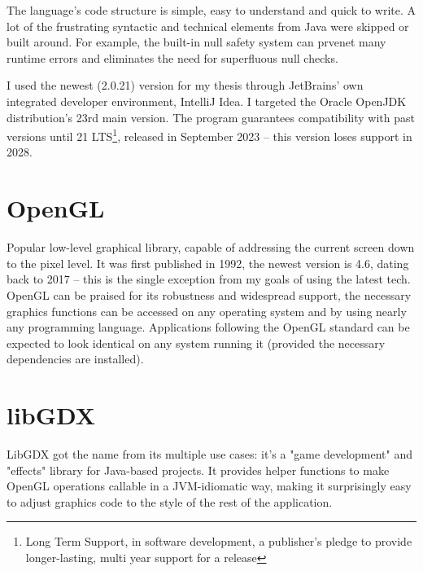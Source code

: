 The language's code structure is simple, easy to understand and quick to write. A lot of the frustrating syntactic and technical elements from Java were skipped or built around. For example, the built-in null safety system can prvenet many runtime errors and eliminates the need for superfluous null checks. 



I used the newest (2.0.21) version for my thesis through JetBrains' own integrated developer environment, IntelliJ Idea. I targeted the Oracle OpenJDK distribution's 23rd main version. The program guarantees compatibility with past versions until 21 LTS\footnote{Long Term Support, in software development, a publisher's pledge to provide longer-lasting, multi year support for a release}, released in September 2023 -- this version loses support in 2028.~\cite{JavaRoadmap}

\section{OpenGL }

Popular low-level graphical library, capable of addressing the current screen down to the pixel level. It was first published in 1992, the newest version is 4.6, dating back to 2017 -- this is the single exception from my goals of using the latest tech.~\cite{OpenglHistory} OpenGL can be praised for its robustness and widespread support, the necessary graphics functions can be accessed on any operating system and by using nearly any programming language. Applications following the OpenGL standard can be expected to look identical on any system running it (provided the necessary dependencies are installed).

\section{libGDX }

LibGDX got the name from its multiple use cases: it's a "game development" and "effects" library for Java-based projects. It provides helper functions to make OpenGL operations callable in a JVM-idiomatic way, making it surprisingly easy to adjust graphics code to the style of the rest of the application.

